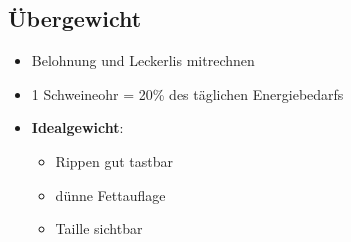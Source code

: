     \subsection{Übergewicht}
        \begin{itemize}
            \item Belohnung und Leckerlis mitrechnen
            \item 1 Schweineohr = 20\% des täglichen Energiebedarfs
            \item \textbf{Idealgewicht}:
            \begin{itemize}
                \item Rippen gut tastbar
                \item dünne Fettauflage
                \item Taille sichtbar
            \end{itemize}
        \end{itemize}